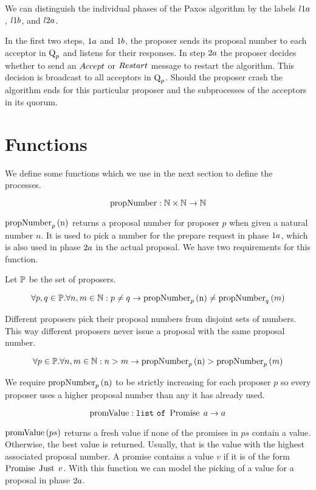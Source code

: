 We can distinguish the individual phases of the Paxos algorithm by the labels $l1a$, $l1b$, and $l2a$.

In the first two steps, $1a$ and $1b$, the proposer sends its proposal number to each acceptor in $\operatorname{Q}_{p}$ and listens for their responses.
In step $2a$ the proposer decides whether to send an $\mathnormal{Accept}$ or $\mathnormal{Restart}$ message to restart the algorithm.
This decision is broadcast to all acceptors in $\operatorname{Q}_{p}$.
Should the proposer crash the algorithm ends for this particular proposer and the subprocesses of the acceptors in its quorum.

\section{Functions}
We define some functions which we use in the next section to define the processes.

\[\operatorname{propNumber} : \mathbb{N} \times \mathbb{N} \to \mathbb{N}\]

$\operatorname{propNumber}_p\left( \operatorname{n}\right)$ returns a proposal number for proposer $p$ when given a natural number $n$.
It is used to pick a number for the prepare request in phase $1a$, which is also used in phase $2a$ in the actual proposal.
We have two requirements for this function.

Let $\mathbb{P}$ be the set of proposers.

\[\forall p,q \in \mathbb{P} . \forall n,m \in \mathbb{N}: p \neq q \to \operatorname{propNumber}_p\left( \operatorname{n}\right) \neq \operatorname{propNumber}_q\left( m\right)\]

Different proposers pick their proposal numbers from disjoint sets of numbers.
This way different proposers never issue a proposal with the same proposal number.

\[\forall p \in \mathbb{P} . \forall n,m \in \mathbb{N}: n > m \to \operatorname{propNumber}_p\left( \operatorname{n}\right) > \operatorname{propNumber}_p\left( m\right)\]

We require $\operatorname{propNumber}_p\left( \operatorname{n}\right)$ to be strictly increasing for each proposer $p$ so every proposer uses a higher proposal number than any it has already used.

\[\operatorname{promValue} : \mathtt{list\ of\ } \operatorname{Promise}\; a \to a\]

$\operatorname{promValue}\left(ps\right)$ returns a fresh value if none of the promises in $ps$ contain a value.
Otherwise, the best value is returned. Usually, that is the value with the highest associated proposal number.
A promise contains a value $v$ if it is of the form $\operatorname{Promise}\; \operatorname{Just}\; v$.
With this function we can model the picking of a value for a proposal in phase $2a$.

